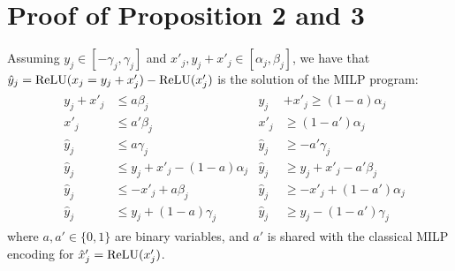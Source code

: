 

\section{Proof of Proposition 2 and 3}

\setcounter{proposition}{1}

\begin{proposition}
	\label{Prop2}
	Assuming $y_j \in [-\gamma_j, \gamma_j]$ and $x'_j,y_j+x'_j \in [\alpha_j,\beta_j]$, we have that $\hat{y}_j = \mathrm{ReLU}(x_j=y_j + x'_j) - \mathrm{ReLU}(x'_j)$ is the solution of the MILP program:
	\begin{align*}
		& \begin{aligned}
			y_j + x'_j &\leq a\beta_j        &
			y_j &+ x'_j \geq (1-a)\alpha_j \\
			x'_j       &\leq a'\beta_j       & 
			x'_j       &\geq (1-a')\alpha_j \\
			\hat{y}_j  &\leq a\gamma_j       &
			\hat{y}_j  &\geq -a'\gamma_j \\
			\hat{y}_j  &\leq y_j + x'_j - (1-a)\alpha_j &
			\hat{y}_j  &\geq y_j + x'_j - a'\beta_j \\
			\hat{y}_j  &\leq -x'_j + a\beta_j &
			\hat{y}_j  &\geq -x'_j + (1-a')\alpha_j \\
			\hat{y}_j  &\leq y_j + (1-a)\gamma_j  &
			\hat{y}_j  &\geq y_j - (1-a')\gamma_j
		\end{aligned}
	\end{align*} 
	where $a,a' \in \{0,1\}$ are binary variables, 
	and $a'$ is shared with the classical MILP
	encoding for $\hat{x}'_j=\mathrm{ReLU}(x'_j)$.
\end{proposition}

